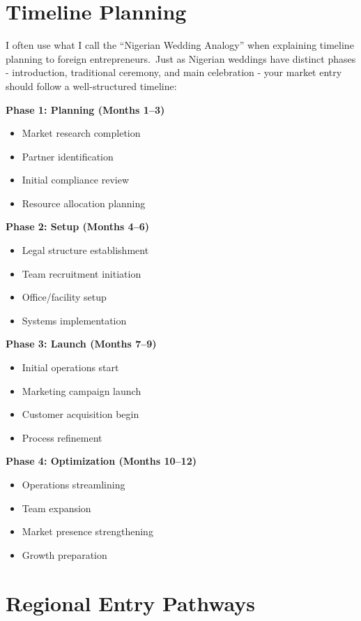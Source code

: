 \section{Timeline Planning}\label{sec:timeline-planning}

I often use what I call the ``Nigerian Wedding Analogy'' when explaining timeline planning to foreign entrepreneurs.\ Just as Nigerian weddings have distinct phases - introduction, traditional ceremony, and main celebration - your market entry should follow a well-structured timeline:

\textbf{Phase 1: Planning (Months 1--3)}
\begin{itemize}
    \item Market research completion
    \item Partner identification
    \item Initial compliance review
    \item Resource allocation planning
\end{itemize}
\vspace{1em}
\textbf{Phase 2: Setup (Months 4--6)}
\begin{itemize}
    \item Legal structure establishment
    \item Team recruitment initiation
    \item Office/facility setup
    \item Systems implementation
\end{itemize}
\vspace{1em}
\textbf{Phase 3: Launch (Months 7--9)}
\begin{itemize}
    \item Initial operations start
    \item Marketing campaign launch
    \item Customer acquisition begin
    \item Process refinement
\end{itemize}
\vspace{1em}
\textbf{Phase 4: Optimization (Months 10--12)}
\begin{itemize}
    \item Operations streamlining
    \item Team expansion
    \item Market presence strengthening
    \item Growth preparation
\end{itemize}
\section{Regional Entry Pathways}\label{sec:regional-entry-pathways}

